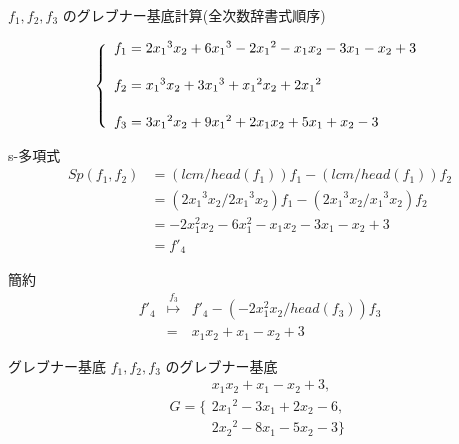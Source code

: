 \documentclass[dvipdfmx,11pt,notheorems]{beamer}
\theoremstyle{definition}
\begin{document}
\begin{frame}
\begin{exampleblock}{$f_1,f_2,f_3$ のグレブナー基底計算(全次数辞書式順序)}

\[ \left\{
\begin{array}{l}
f_1 = 2{x_1}^3x_2 +6{x_1}^3-2{x_1}^2-x_1x_2-3x_1-x_2+3\vspace{.2in}\\
f_2 = {x_1}^3x_2 + 3{x_1}^3 + {x_1}^2x_2 + 2{x_1}^2\vspace{.2in}\\
f_3 = 3{x_1}^2x_2 + 9{x_1}^2 + 2x_1x_2 + 5x_1 + x_2 -3
\end{array}
\right. \]
\end{exampleblock}

\begin{exampleblock}{s-多項式}
\[
\begin{array}{ll} 
Sp(f_1,f_2) &= ( lcm / head(f_1) ) f_1 - ( lcm / head(f_1)) f_2 \\
            &= ( 2{x_1}^3x_2 / 2{x_1}^3x_2 ) f_1 - ( 2{x_1}^3x_2 / {x_1}^3x_2 ) f_2 \\
	    &= -2x_1^2 x_2 -6x_1^2 -x_1 x_2 - 3x_1 -x_2 +3 \\
	    &= f'_4
\end{array}
\]
\end{exampleblock}

\begin{exampleblock}{簡約}
\[
\begin{array}{lll}
f'_4 & \stackrel{f_3}{\longmapsto} & f'_4 - (-2x_1^2 x_2 /{head(f_3)})f_3 \\
     & = & x_1 x_2+ x_1 -x_2 +3
\end{array}
\]
\end{exampleblock}
\end{frame}

\begin{frame}
\begin{exampleblock}{グレブナー基底}
$f_1,f_2,f_3$ のグレブナー基底
\[ 
	G = \{
 \begin{array}{l}
  x_1 x_2 + x_1- x_2 + 3, \\
  2{x_1}^2 - 3 x_1 + 2 x_2 - 6, \\
  2{x_2}^2 - 8 x_1 - 5 x_2 -3 \}
 \end{array} 
\]
\end{exampleblock}
\end{frame}
\end{document}
